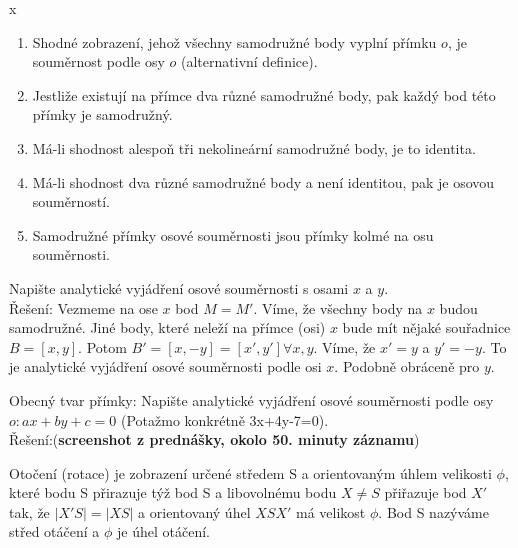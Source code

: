 \documentclass[../main.tex]{subfiles}
\begin{document}
\begin{remark}
    {\color{white} x}
    \begin{enumerate}
        \item Shodné zobrazení, jehož všechny samodružné body vyplní přímku $o$, je souměrnost
        podle osy $o$ (alternativní definice).
        \item Jestliže existují na přímce dva různé samodružné body, pak každý bod této přímky
        je samodružný.
        \item Má-li shodnost alespoň tři nekolineární samodružné body, je to identita.
        \item Má-li shodnost dva různé samodružné body a není identitou, pak je osovou souměrností.
        \item Samodružné přímky osové souměrnosti jsou přímky kolmé na osu souměrnosti.
    \end{enumerate}
\end{remark}

\begin{example}
    Napište analytické vyjádření osové souměrnosti s osami $x$ a $y$.\\
    Řešení: Vezmeme na ose $x$ bod $M=M'$. Víme, že všechny body na $x$ budou samodružné.
    Jiné body, které neleží na přímce (osi) $x$ bude mít nějaké souřadnice $B = [x,y]$.
    Potom $B' = [x,-y] = [x',y'] \forall x,y$. Víme, že $x' = y$ a $y' = -y$. To je analytické vyjádření
    osové souměrnosti podle osi $x$. Podobně obráceně pro $y$. 
\end{example}

\begin{example}
    Obecný tvar přímky: Napište analytické vyjádření osové souměrnosti podle osy \\
    $o:ax+by+c=0$ (Potažmo konkrétně 3x+4y-7=0).\\
    Řešení:(\textbf{screenshot z prednášky, okolo 50. minuty záznamu})
\end{example}

\begin{definition}[Otočení]
    Otočení (rotace) je zobrazení určené středem S a orientovaným úhlem velikosti $\phi$, které bodu
    S přirazuje týž bod S a libovolnému bodu $X \neq S$ přiřazuje bod $X'$ tak, že $|X'S| = |XS|$ a orientovaný
    úhel $XSX'$ má velikost $\phi$. Bod S nazýváme střed otáčení a $\phi$ je úhel otáčení.
\end{definition}
\end{document}
